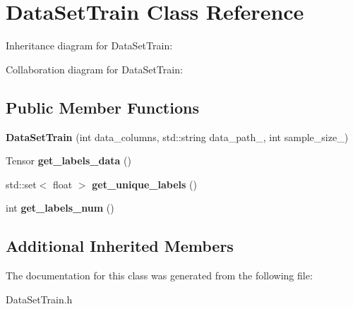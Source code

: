 \hypertarget{classDataSetTrain}{}\section{Data\+Set\+Train Class Reference}
\label{classDataSetTrain}


Inheritance diagram for Data\+Set\+Train\+:


Collaboration diagram for Data\+Set\+Train\+:
\subsection*{Public Member Functions}
\begin{DoxyCompactItemize}
\item 
\mbox{\label{classDataSetTrain_a1370ddf4a872ae3399f1e0ee777c5e76}} 
{\bfseries Data\+Set\+Train} (int data\+\_\+columns, std\+::string data\+\_\+path\+\_\+, int sample\+\_\+size\+\_\+)
\item 
\mbox{\label{classDataSetTrain_a533d443deb06c496c78d4879b5b3e10d}} 
Tensor {\bfseries get\+\_\+labels\+\_\+data} ()
\item 
\mbox{\label{classDataSetTrain_a65573cff6489b1b466d2a173660c5551}} 
std\+::set$<$ float $>$ {\bfseries get\+\_\+unique\+\_\+labels} ()
\item 
\mbox{\label{classDataSetTrain_a2ee248bf55b0d50b5857fe0017261786}} 
int {\bfseries get\+\_\+labels\+\_\+num} ()
\end{DoxyCompactItemize}
\subsection*{Additional Inherited Members}


The documentation for this class was generated from the following file\+:\begin{DoxyCompactItemize}
\item 
Data\+Set\+Train.\+h\end{DoxyCompactItemize}

